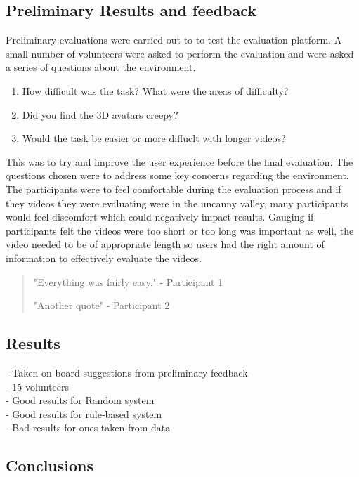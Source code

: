 \documentclass[bsc,frontabs,twoside,singlespacing,parskip]{infthesis}
\begin{document}
\subsection{Preliminary Results and feedback}

Preliminary evaluations were carried out to to test the evaluation platform. A small number of volunteers were asked to perform the evaluation and were asked a series of questions about the environment.

\begin{enumerate}
\item{How difficult was the task? What were the areas of difficulty?}
\item{Did you find the 3D avatars creepy?}
\item{Would the task be easier or more diffuclt with longer videos?}
\end{enumerate}

This was to try and improve the user experience before the final evaluation. The questions chosen were to address some key concerns regarding the environment. The participants were to feel comfortable during the evaluation process and if they videos they were evaluating were in the uncanny valley, many participants would feel discomfort which could negatively impact results. Gauging if participants felt the videos were too short or too long was important as well, the video needed to be of appropriate length so users had the right amount of information to effectively evaluate the videos.

\begin{quotation}
"Everything was fairly easy." - Participant 1

"Another quote" - Participant 2
\end{quotation}

\subsection{Results}

- Taken on  board suggestions from preliminary feedback \\
- 15 volunteers \\
- Good results for Random system \\
- Good results for rule-based system \\
- Bad results for ones taken from data \\

\subsection{Conclusions}
\end{document}
